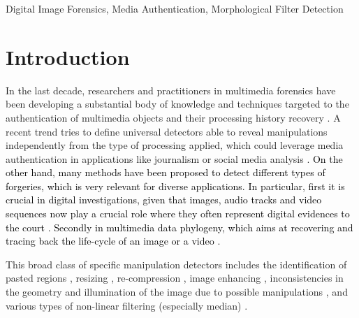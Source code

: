\documentclass{ieeeaccess}
\newcommand{\revisedtext}[1]{\textcolor{black}{#1}}
\begin{document}
\begin{keywords}
Digital Image Forensics, Media Authentication, Morphological Filter Detection
%
\end{keywords}

\titlepgskip=-15pt

\maketitle

\section{Introduction}
\label{sec:intro}

In the last decade, researchers and practitioners in multimedia forensics have been developing a substantial body of knowledge and techniques targeted to the authentication of multimedia objects and their processing history recovery \cite{stamm_overview, farid_book, ho, piva_overview, sencar_book}. 
A recent trend tries to define universal detectors able to reveal manipulations independently from the type of processing applied, which could leverage media authentication in applications like journalism or social media analysis \cite{noiseprint}. 
\revisedtext{On the other hand, many methods have been proposed to detect different types of forgeries, which is very relevant for diverse applications. In particular, first it is crucial in digital investigations, given that images, audio tracks and video sequences now play a crucial role where they often represent digital evidences to the court \cite{forlab}. Secondly in multimedia data phylogeny, which aims at recovering and tracing back the life-cycle of an image or a video \cite{Bestagini2016, Dias2012, Oliveira2016, Costa2014}.}

This broad class of specific manipulation detectors includes the identification of pasted regions \cite{cm2, cm3, cm4, spl2, spl3}, resizing \cite{fernando2017, PB-TIFS-2019}, re-compression \cite{PBPG2017-TIFS},  image enhancing \cite{shan2019robust}, inconsistencies in the geometry and illumination of the image due to possible manipulations \cite{geom1, geom2, phys1}, and various types of non-linear filtering (especially median) \cite{Bahrami2015, Cao2014, Cao2011, Fridrich2010, Tian2010, Yuan:2011, Liu2013, Huang2013, Shi2014, Wang2015, Pasquini2016-TIFS, gao2019robust}. 
\end{document}
